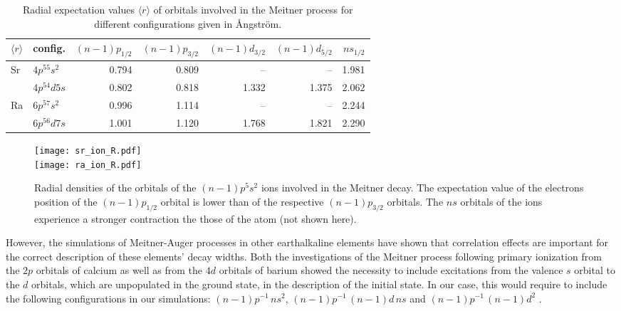 \documentclass[aps,amssymb,preprint,a4paper]{revtex4}
\begin{document}
%
\begin{table}[h]
 \centering
 \caption{Radial expectation values $\langle r \rangle$ of
          orbitals involved in the Meitner process
          for different configurations
          given in {\AA}ngstr{\"o}m.
}
 \begin{tabular}{llrrrrr}
  \toprule
   $\langle r \rangle$ &     config. &   $(n-1)p_{1/2}$ & $(n-1)p_{3/2}$ & $(n-1)d_{3/2}$ & $(n-1)d_{5/2}$ & $ns_{1/2}$\\
  \midrule
   \multirow{2}{*}{Sr} & $4p^55s^2$ & 0.794 &     0.809    &      --        &        --      &  1.981\\
       &      $4p^54d5s$ &            0.802 &     0.818    &    1.332       &      1.375     &  2.062\\
   \multirow{2}{*}{Ra} & $6p^57s^2$ & 0.996 &     1.114    &      --        &        --      &  2.244\\
       &      $6p^56d7s$ &            1.001 &     1.120    &    1.768       &      1.821     &  2.290\\
  \bottomrule
 \end{tabular}
 \label{tab:widths}
\end{table}

\begin{figure}[h]
 \centering
 \texttt{[image: sr\_ion\_R.pdf]}\\
 \texttt{[image: ra\_ion\_R.pdf]}\\
 \caption{Radial densities of the orbitals of the $(n-1)p^5s^2$ ions
          involved in the Meitner decay.
          The expectation value of the electrons position of the $(n-1)p_{1/2}$
          orbital is lower than of the respective $(n-1)p_{3/2}$
          orbitals. The $ns$ orbitals of the ions experience a stronger
          contraction the those of the atom (not shown here).}
 \label{fig:radial_pure}
\end{figure}

However, the simulations of Meitner-Auger processes in other earthalkaline elements
have shown that correlation effects are important for the correct
description of these elements' decay widths. Both the investigations of
the Meitner process following primary ionization
from the $2p$ orbitals of calcium \cite{Nikkinen05}
as well as from the $4d$ orbitals of barium \cite{Rose80}
showed the necessity to include excitations from the valence $s$ orbital to
the $d$ orbitals, which are unpopulated in the ground state, in the
description of the initial state.
In our case, this would require to include the following configurations in our
simulations:
 $(n-1)p^{-1} \,ns^2$,
 $(n-1)p^{-1} \,(n-1)d \, ns$ and
 $(n-1)p^{-1} \,(n-1)d^2$ .    
\end{document}
